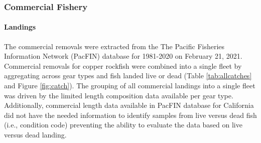 \documentclass[11pt,
  english,
  a4paper,
]{article}
\begin{document}
\leavevmode\tagmcend\tagstructend


\hypertarget{commercial-fishery}{%
\subsubsection{Commercial Fishery}\label{commercial-fishery}}

\leavevmode\tagmcend\tagstructend


\hypertarget{landings}{%
\paragraph{Landings}\label{landings}}

\leavevmode\tagmcend\tagstructend


The commercial removals were extracted from the The Pacific Fisheries Information Network (PacFIN) database for 1981-2020 on February 21, 2021. Commercial removals for copper rockfish were combined into a single fleet by aggregating across gear types and fish landed live or dead (Table \ref{tab:allcatches} and Figure \ref{fig:catch}). The grouping of all commercial landings into a single fleet was driven by the limited length composition data available per gear type. Additionally, commercial length data available in PacFIN database for California did not have the needed information to identify samples from live versus dead fish (i.e., condition code) preventing the ability to evaluate the data based on live versus dead landing.

\leavevmode\tagmcend\tagstructend\par

\end{document}
